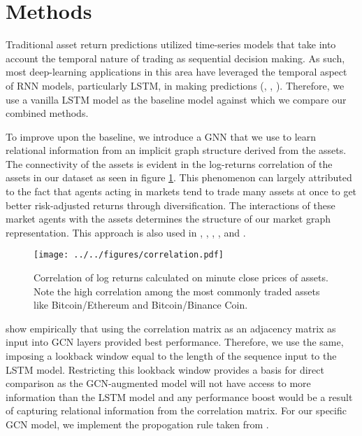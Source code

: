 \section{Methods} \label{Methods}

Traditional asset return predictions utilized time-series models that take into account the temporal nature of trading as sequential decision making. As such, most deep-learning applications in this area have leveraged the temporal aspect of RNN models, particularly LSTM, in making predictions (\cite{Shen2020}, \cite{Li2018}, \cite{Selvin2017}). Therefore, we use a vanilla LSTM model as the baseline model against which we compare our combined methods.

To improve upon the baseline, we introduce a GNN that we use to learn relational information from an implicit graph structure derived from the assets. The connectivity of the assets is evident in the log-returns correlation of the assets in our dataset as seen in figure \ref{fig:asset_corr}. This phenomenon can largely attributed to the fact that agents acting in markets tend to trade many assets at once to get better risk-adjusted returns through diversification. The interactions of these market agents with the assets determines the structure of our market graph representation. This approach is also used in \cite{Matsunaga2019}, \cite{Feng2019}, \cite{Sun2020}, \cite{Hou2021}, and \cite{Peng2021}.

\begin{figure}[H]
	\centering
	\texttt{[image: ../../figures/correlation.pdf]}
	\caption{Correlation of log returns calculated on minute close prices of assets. Note the high correlation among the most commonly traded assets like Bitcoin/Ethereum and Bitcoin/Binance Coin.}
	\label{fig:asset_corr}
\end{figure}

\cite{Peng2021} show empirically that using the correlation matrix as an adjacency matrix as input into GCN layers provided best performance. Therefore, we use the same, imposing a lookback window equal to the length of the sequence input to the LSTM model. Restricting this lookback window provides a basis for direct comparison as the GCN-augmented model will not have access to more information than the LSTM model and any performance boost would be a result of capturing relational information from the correlation matrix. For our specific GCN model, we implement the propogation rule taken from \cite{Kipf2017}.